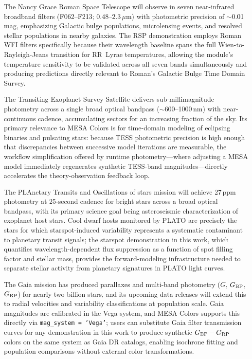 \documentclass[linenumbers,apj,twocolumn, floatfix]{aastex701} \usepackage{amsmath} \usepackage{longtable} \usepackage{graphicx} \usepackage{ulem} \usepackage{xcolor} \usepackage{lettrine} \usepackage{yfonts} \usepackage{rotating}
\begin{document}
The Nancy Grace Roman Space Telescope \citep{roman} will observe in seven near-infrared broadband filters (F062--F213; $0.48$--$2.3\,\mu$m) with photometric precision of $\sim$0.01\,mag, emphasizing Galactic bulge populations, microlensing events, and resolved stellar populations in nearby galaxies.
The RSP demonstration employs Roman WFI filters specifically because their wavelength baseline spans the full Wien-to-Rayleigh-Jeans transition for RR~Lyrae temperatures, allowing the module's temperature sensitivity to be validated across all seven bands simultaneously and producing predictions directly relevant to Roman's Galactic Bulge Time Domain Survey.

The Transiting Exoplanet Survey Satellite \citep[TESS;][]{tess} delivers sub-millimagnitude photometry across a single broad optical bandpass ($\sim$600--1000\,nm) with near-continuous cadence, accumulating sectors for an increasing fraction of the sky.
Its primary relevance to MESA Colors is for time-domain modeling of eclipsing binaries and pulsating stars: because TESS photometric precision is high enough that discrepancies between successive model iterations are measurable, the workflow simplification offered by runtime photometry---where adjusting a MESA model immediately regenerates synthetic TESS-band magnitudes---directly accelerates the theory-observation feedback loop.

The PLAnetary Transits and Oscillations of stars mission \citep{plato} will achieve 27\,ppm photometry at 25-second cadence for bright stars across a broad optical bandpass, with its primary science goal being asteroseismic characterization of exoplanet host stars.
Cool dwarf hosts monitored by PLATO are precisely the stars for which starspot-induced variability represents a systematic contaminant to planetary transit signals; the starspot demonstration in this work, which quantifies wavelength-dependent flux suppression as a function of spot filling factor and stellar mass, provides the forward-modeling infrastructure needed to separate stellar activity from planetary signatures in PLATO light curves.

The Gaia mission \citep{gaia_edr3_2} has produced parallaxes and multi-band photometry ($G$, $G_{\rm BP}$, $G_{\rm RP}$) for nearly two billion stars, and its upcoming data releases will extend this to radial velocities and variability classifications at population scale.
Gaia magnitudes are calibrated in the Vega system, and MESA Colors supports this directly via \texttt{mag\_system = `Vega'}; users can substitute Gaia filter transmission curves for any demonstration in this work to produce synthetic $G_{\rm BP} - G_{\rm RP}$ colors on the same system as Gaia DR catalogs, enabling isochrone fitting and population comparisons without external color transformations.
\end{document}
